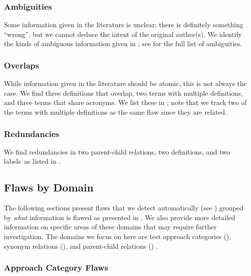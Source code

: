 \subsubsection{Ambiguities}\label{ambi}
Some information given in the literature is unclear; there is definitely
something ``wrong'', but we cannot deduce the intent of the original author(s).
We identify the kinds of ambiguous information given in %
\ifnotpaper; see  for the full list of ambiguities\fi.



\subsubsection{Overlaps}\label{over}
While information given in the literature should be atomic, this is not
always the case. We find three definitions that overlap, two terms with
multiple definitions, and three terms that share acronyms. \ifnotpaper We list
    these in ; note that we track two of the terms with
    multiple definitions as the same flaw since they are related. \fi

\subsubsection{Redundancies}\label{redun}
We find redundancies in two parent-child relations, two definitions, and two
labels\ifnotpaper\ as listed in \fi.

\subsection{Flaws by Domain}\label{flawDmns}

The following sections present flaws that we detect automatically \ifnotpaper
    (see ) \fi grouped by \emph{what} information
is flawed as presented in . We also provide more detailed
information on specific areas of these domains that may require further
investigation. The domains we focus on here are test approach categories
(), synonym relations (), and parent-child relations
()%
.

\ifnotpaper\else
    
    
\fi

\subsubsection{Approach Category Flaws}\label{cats}

